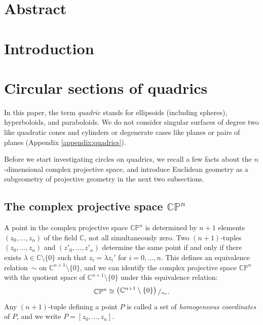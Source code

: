 \documentclass[12pt,a4paper]{article}
\newcommand{\bigslant}[2]{{\raisebox{.2em}{$#1$}\left/\raisebox{-.2em}{$#2$}\right.}}
\theoremstyle{BoldTopSpacing}
\theoremstyle{BoldTopSpacing}
\theoremstyle{BoldTopSpacing}
\theoremstyle{BoldTopBottomSpacing}
\theoremstyle{BoldTopSpacing}
\theoremstyle{BoldTopBottomSpacing}
\theoremstyle{remark}
\begin{document}
\pagestyle{fancy}
\section*{Abstract}
\label{sec:abstract}

\pagebreak
\pagestyle{tocstyle}
\renewcommand{\contentsname}{Contents}
\tableofcontents
\pagebreak
\listoffigures
\pagebreak
\pagestyle{fancy}
\section{Introduction}
\label{sec:introduction}
\pagebreak
\section{Circular sections of quadrics}
\label{sec:circular-sections-of-quadrics}

In this paper, the term \textit{quadric} stands for ellipsoids (including spheres), hyperboloids, and paraboloids. We do not consider singular surfaces of degree two like quadratic cones and cylinders or degenerate cases like planes or pairs of planes (Appendix \ref{appendix:quadrics}).

Before we start investigating circles on quadrics, we recall a few facts about the $n$-dimensional complex projective space, and introduce Euclidean geometry as a subgeometry of projective geometry in the next two subsections. \par

\subsection{The complex projective space $\mathbb{C}\mathbb{P}^n$}
\label{subsec:complex-projective-space}

A point in the complex projective space $\mathbb{C}\mathbb{P}^{n}$ is determined by $n + 1$ elements $(z_{0}, \dots, z_{n})$ of the field $\mathbb{C}$, not all simultaneously zero. Two $(n + 1)$-tuples $(z_{0}, \dots, z_{n})$ and $(z'_{0}, \dots, z'_{n})$ determine the same point if and only if there exists $\lambda \in \mathbb{C} \setminus \{ 0 \}$ such that $z_{i} = \lambda z_{i}'$ for $i = 0, \dots, n$. This defines an equivalence relation~$\sim$ on $\mathbb{C}^{n + 1} \setminus \{ 0 \}$, and we can identify the complex projective space $\mathbb{C}\mathbb{P}^n$ with the quotient space of $\mathbb{C}^{n + 1} \setminus \{ 0 \}$ under this equivalence relation:
\[
    \mathbb{C}\mathbb{P}^n \cong \bigslant{\left( \mathbb{C}^{n + 1} \setminus \{ 0 \} \right)}{\sim}.
\]
Any $(n+1)$-tuple defining a point $P$ is called a set of \textit{homogeneous coordinates} of $P$, and we write $P = [z_{0},\dots, z_{n}]$.\par
\end{document}
